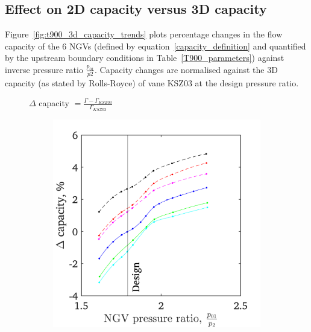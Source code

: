\documentclass[a4paper, 11pt, oneside]{report}
\begin{document}
\subsection{Effect on 2D capacity versus 3D capacity}

Figure~\ref{fig:t900_3d_capacity_trends} plots percentage changes in the flow capacity of the 6 NGVs (defined by equation~\ref{capacity_definition} and quantified by the upstream boundary conditions in Table~\ref{T900_parameters}) against inverse pressure ratio $\frac{p_{01}}{p2}$. Capacity changes are normalised against the 3D capacity (as stated by Rolls-Royce) of vane KSZ03 at the design pressure ratio.

\begin{figure}[H]
	\centering
	$\Delta$ capacity $= \frac{\Gamma - \Gamma_{KSZ03}}{\Gamma_{KSZ03}}$
	\hspace{0.45cm}
	\begin{subfigure}{.45\textwidth}
		\centering
		\includegraphics[width=\linewidth]{figs/t900_3d_capacity_trends.png}
	\end{subfigure}
	\begin{subfigure}{.1125\textwidth}
		\centering

\end{subfigure}
\end{figure}
\end{document}
